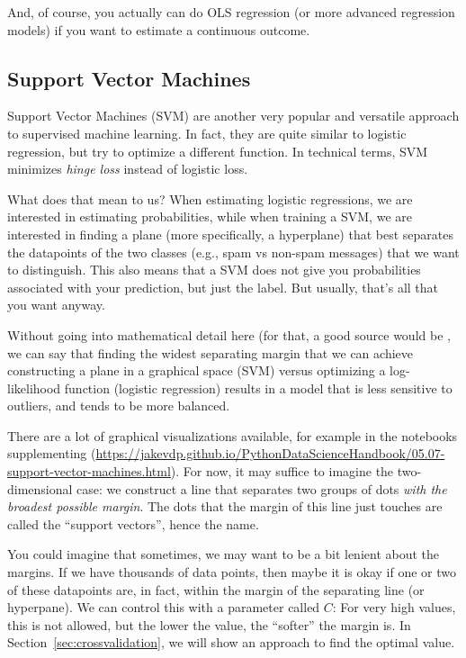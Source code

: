 And, of course, you actually can do OLS regression (or more advanced
regression models) if you want to estimate a continuous outcome.





\subsection{Support Vector Machines}
Support Vector Machines (SVM) are another very popular and versatile
approach to supervised machine learning.  In fact, they are quite
similar to logistic regression, but try to optimize a different
function. In technical terms, SVM minimizes \emph{hinge loss} instead
of logistic loss.

What does that mean to us? When estimating logistic regressions, we
are interested in estimating probabilities, while when training a
SVM, we are interested in finding a plane (more
specifically, a hyperplane) that best separates the datapoints of the
two classes (e.g., spam vs non-spam messages) that we want to
distinguish.  This also means that a SVM does not give you
probabilities associated with your prediction, but just the label.
But usually, that's all that you want anyway.

Without going into mathematical detail here (for that, a good source
would be \citet{kelleher2015fundamentals}, we can say that finding the
widest separating margin that we can achieve constructing a plane in a
graphical space (SVM) versus optimizing a log-likelihood function
(logistic regression) results in a model that is less sensitive to
outliers, and tends to be more balanced.

There are a lot of graphical visualizations available, for example in
the notebooks supplementing \citep{vanderplas2016python}
(\url{https://jakevdp.github.io/PythonDataScienceHandbook/05.07-support-vector-machines.html}).
For now, it may suffice to imagine the two-dimensional case: we
construct a line that separates two groups of dots \emph{with the
  broadest possible margin}. The dots that the margin of this line
just touches are called the ``support vectors'', hence the name.

You could imagine that sometimes, we may want to be a bit lenient
about the margins. If we have thousands of data points, then maybe it
is okay if one or two of these datapoints are, in fact, within the
margin of the separating line (or hyperpane). We can control this with
a parameter called $C$: For very high values, this is not allowed, but
the lower the value, the ``softer'' the margin is.  In
Section~\ref{sec:crossvalidation}, we will show an approach to find
the optimal value.

